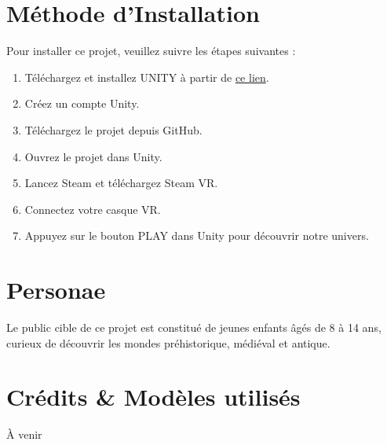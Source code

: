 \documentclass{article}
\begin{document}
\section{Méthode d'Installation}
Pour installer ce projet, veuillez suivre les étapes suivantes :
\begin{enumerate}
    \item Téléchargez et installez UNITY à partir de \href{https://public-cdn.cloud.unity3d.com/hub/prod/UnityHubSetup.exe}{ce lien}.
    \item Créez un compte Unity.
    \item Téléchargez le projet depuis GitHub.
    \item Ouvrez le projet dans Unity.
    \item Lancez Steam et téléchargez Steam VR.
    \item Connectez votre casque VR.
    \item Appuyez sur le bouton PLAY dans Unity pour découvrir notre univers.
\end{enumerate}

\section{Personae}
Le public cible de ce projet est constitué de jeunes enfants âgés de 8 à 14 ans, curieux de découvrir les mondes préhistorique, médiéval et antique.

\section{Crédits & Modèles utilisés}
À venir
\end{document}

